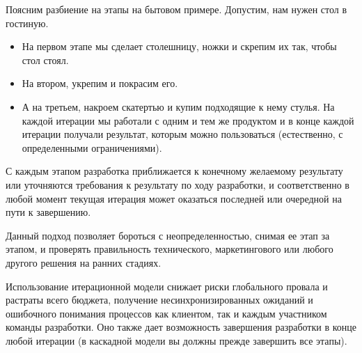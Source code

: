 Поясним разбиение на этапы на бытовом примере. Допустим, нам нужен стол в гостиную.

\begin{itemize}
\item На первом этапе мы сделает столешницу, ножки и скрепим их так, чтобы стол стоял.
\item На втором, укрепим и покрасим его.
\item А на третьем, накроем скатертью и купим подходящие к нему стулья.
На каждой итерации мы работали с одним и тем же продуктом и в конце каждой итерации получали результат, которым можно пользоваться (естественно, с определенными ограничениями).
\end{itemize}
С каждым этапом разработка приближается к конечному желаемому результату или уточняются требования к результату по ходу разработки, и соответственно в любой момент текущая итерация может оказаться последней или очередной на пути к завершению.

Данный подход позволяет бороться с неопределенностью, снимая ее этап за этапом, и проверять правильность технического, маркетингового или любого другого решения на ранних стадиях. 

Использование итерационной модели снижает риски глобального провала и растраты всего бюджета, получение несинхронизированных ожиданий и ошибочного понимания процессов как клиентом, так и каждым участником команды разработки. Оно также дает возможность завершения разработки в конце любой итерации (в каскадной модели вы должны прежде завершить все этапы).

